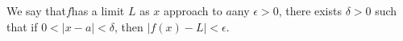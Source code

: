 \documentclass[preview]{standalone}
\begin{document}
\begin{center}
We say that$f$has a limit $L $ as $x$ approach to $a$\Given any $\epsilon > 0$, there exists $\delta > 0$ such that if $0 < |x - a| < \delta$, then $|f(x) - L| < \epsilon$.
\end{center}
\end{document}
